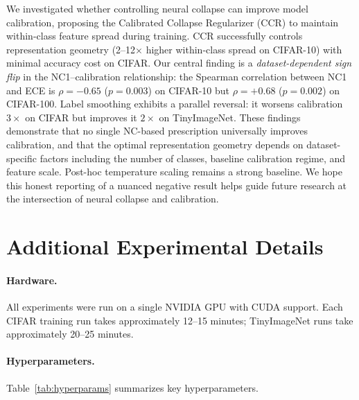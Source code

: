 \documentclass{article}
\begin{document}
We investigated whether controlling neural collapse can improve model calibration, proposing the Calibrated Collapse Regularizer (CCR) to maintain within-class feature spread during training. CCR successfully controls representation geometry (2--12$\times$ higher within-class spread on CIFAR-10) with minimal accuracy cost on CIFAR. Our central finding is a \emph{dataset-dependent sign flip} in the NC1--calibration relationship: the Spearman correlation between NC1 and ECE is $\rho = -0.65$ ($p = 0.003$) on CIFAR-10 but $\rho = +0.68$ ($p = 0.002$) on CIFAR-100. Label smoothing exhibits a parallel reversal: it worsens calibration $3\times$ on CIFAR but improves it $2\times$ on TinyImageNet. These findings demonstrate that no single NC-based prescription universally improves calibration, and that the optimal representation geometry depends on dataset-specific factors including the number of classes, baseline calibration regime, and feature scale. Post-hoc temperature scaling remains a strong baseline. We hope this honest reporting of a nuanced negative result helps guide future research at the intersection of neural collapse and calibration.




\newpage
\appendix
\section{Additional Experimental Details}
\label{app:details}

\paragraph{Hardware.} All experiments were run on a single NVIDIA GPU with CUDA support. Each CIFAR training run takes approximately 12--15 minutes; TinyImageNet runs take approximately 20--25 minutes.

\paragraph{Hyperparameters.} Table~\ref{tab:hyperparams} summarizes key hyperparameters.
\end{document}
